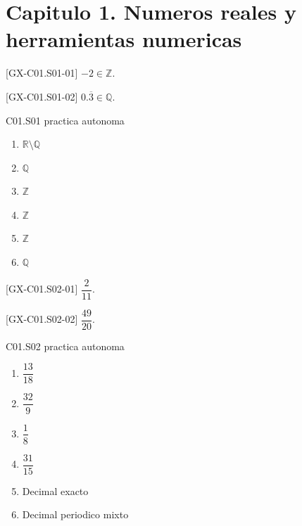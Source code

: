 \section*{Capitulo 1. Numeros reales y herramientas numericas}

\begin{shortanswer}{[GX-C01.S01-01]}
\(-2\in\mathbb{Z}\).
\end{shortanswer}

\begin{shortanswer}{[GX-C01.S01-02]}
\(0.\overline{3}\in\mathbb{Q}\).
\end{shortanswer}

\begin{shortanswer}{C01.S01 practica autonoma}
\begin{enumerate}[label=\textbf{PX-C01.S01-\arabic*:}, leftmargin=*]
  \item \(\mathbb{R}\setminus\mathbb{Q}\)
  \item \(\mathbb{Q}\)
  \item \(\mathbb{Z}\)
  \item \(\mathbb{Z}\)
  \item \(\mathbb{Z}\)
  \item \(\mathbb{Q}\)
\end{enumerate}
\end{shortanswer}

\begin{shortanswer}{[GX-C01.S02-01]}
\(\dfrac{2}{11}\).
\end{shortanswer}

\begin{shortanswer}{[GX-C01.S02-02]}
\(\dfrac{49}{20}\).
\end{shortanswer}

\begin{shortanswer}{C01.S02 practica autonoma}
\begin{enumerate}[label=\textbf{PX-C01.S02-\arabic*:}, leftmargin=*]
  \item \(\dfrac{13}{18}\)
  \item \(\dfrac{32}{9}\)
  \item \(\dfrac{1}{8}\)
  \item \(\dfrac{31}{15}\)
  \item Decimal exacto
  \item Decimal periodico mixto
\end{enumerate}
\end{shortanswer}

